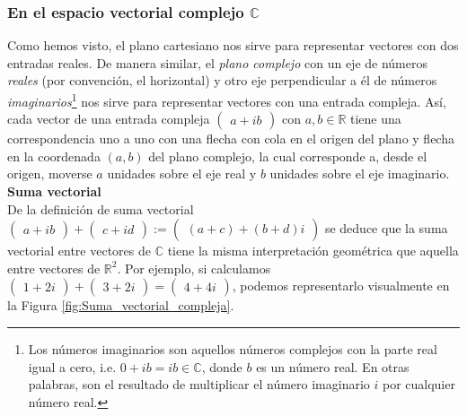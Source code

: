 \documentclass[apuntes]{subfiles}
\begin{document}
\subsubsection*{En el espacio vectorial complejo \texorpdfstring{$\mathbb{C}$}{TEXT}}

Como hemos visto, el plano cartesiano nos sirve para representar vectores con dos entradas reales. De manera similar, el \emph{plano complejo} \textemdash con un eje de números \emph{reales} (por convención, el horizontal) y otro eje perpendicular a él de números \emph{imaginarios}\footnote{Los números imaginarios son aquellos números complejos con la parte real igual a cero, i.e. $0+ib=ib\in\mathbb{C}$, donde $b$ es un número real. En otras palabras, son el resultado de multiplicar el número imaginario $i$ por cualquier número real.}\textemdash\hspace{0.5mm} nos sirve para representar vectores con una entrada compleja. Así, cada vector de una entrada compleja $\begin{pmatrix}a+ib\end{pmatrix}$ con $a,b\in\mathbb{R}$ tiene una correspondencia uno a uno con una flecha con cola en el origen del plano y flecha en la coordenada $(a,b)$ del plano complejo, la cual corresponde a, desde el origen, moverse $a$ unidades sobre el eje real y $b$ unidades sobre el eje imaginario. \\

\textbf{Suma vectorial} \\

De la definición de suma vectorial $\begin{pmatrix}a+ib\end{pmatrix}+\begin{pmatrix}c+id\end{pmatrix}:=\begin{pmatrix}(a+c)+(b+d)i\end{pmatrix}$ se deduce que la suma vectorial entre vectores de $\mathbb{C}$ tiene la misma interpretación geométrica que aquella entre vectores de $\mathbb{R}^2$. Por ejemplo, si calculamos $\begin{pmatrix}1+2i\end{pmatrix}+\begin{pmatrix}3+2i\end{pmatrix}=\begin{pmatrix}4+4i\end{pmatrix}$, podemos representarlo visualmente en la Figura \ref{fig:Suma_vectorial_compleja}. \\
\end{document}
